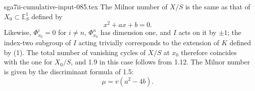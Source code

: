 \begin{filecontents*}{sga7ii-cumulative-input-085.tex}
The Milnor number of $X/S$ is the same as that of
$X_0\subset\mathbb E_S^1$ defined by
\begin{equation}\tag{1}
x^2+a x+b=0.
\end{equation}
Likewise, $\Phi^i_{x_0}=0$ for $i\ne n$,
$\Phi^n_{x_0}$ has dimension one, and $I$ acts on it by $\pm1$; the
index-two subgroup of $I$ acting trivially corresponds to the
extension of $K$ defined by (1).  The total number of vanishing
cycles of $X/S$ at $x_0$ therefore coincides with the one for
$X_0/S$, and 1.9 in this case follows from 1.12.  The Milnor number
is given by the discriminant formula of 1.5:
\begin{equation}\tag{1.13.1}
\mu=v(a^2-4b).
\end{equation}
\end{filecontents*}
